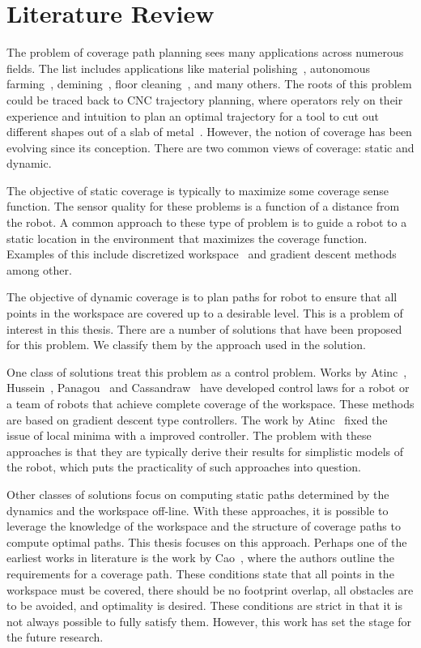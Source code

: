 \documentclass[../main.tex]{subfiles}
\begin{document}
\chapter{Literature Review}
\label{chapter:literature_review}

The problem of coverage path planning sees many applications across numerous fields. The list includes applications like material polishing~\cite{rososhansky2010coverage}, autonomous farming~\cite{ollis1997vision}, demining~\cite{acar2003path}, floor cleaning~\cite{yasutomi1988cleaning}, and many others. The roots of this problem could be traced back to CNC trajectory planning, where operators rely on their experience and intuition to plan an optimal trajectory for a tool to cut out different shapes out of a slab of metal~\cite{held1991computational}. However, the notion of coverage has been evolving since its conception. There are two common views of coverage: static and dynamic.

The objective of static coverage is typically to maximize some coverage sense function. The sensor quality for these problems is a function of a distance from the robot. A common approach to these type of problem is to guide a robot to a static location in the environment that maximizes the coverage function. Examples of this include discretized  workspace~\cite{durham2012discrete} and gradient descent methods~\cite{cortes2002coverage} among other.

The objective of dynamic coverage is to plan paths for robot to ensure that all points in the workspace are covered up to a desirable level. This is a problem of interest in this thesis. There are a number of solutions that have been proposed for this problem. We classify them by the approach used in the solution.

One class of solutions treat this problem as a control problem. Works by Atinc~\cite{atincc2013supervised}, Hussein~\cite{hussein2007effective}, Panagou~\cite{panagou2014vision} and Cassandraw~\cite{cassandras2013optimal} have developed control laws for a robot or a team of robots that achieve complete coverage of the workspace. These methods are based on gradient descent type controllers. The work by Atinc~\cite{atincc2013supervised} fixed the issue of local minima with a improved controller. The problem with these approaches is that they are typically derive their results for simplistic models of the robot, which puts the practicality of such approaches into question. 

Other classes of solutions focus on computing static paths determined by the dynamics and the workspace off-line. With these approaches, it is possible to leverage the knowledge of the workspace and the structure of coverage paths to compute optimal paths. This thesis focuses on this approach. Perhaps one of the earliest works in literature is the work by Cao~\cite{cao1988region}, where the authors outline the requirements for a coverage path. These conditions state that all points in the workspace must be covered, there should be no footprint overlap, all obstacles are to be avoided, and optimality is desired. These conditions are strict in that it is not always possible to fully satisfy them. However, this work has set the stage for the future research.
\end{document}
